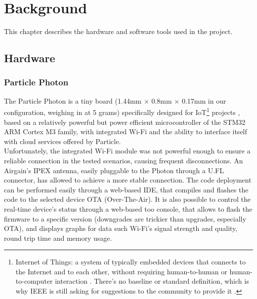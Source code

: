 \chapter{Background}
This chapter describes the hardware and software tools used in the project.

\section{Hardware}
\subsection{Particle Photon}
The Particle Photon is a tiny board (1.44mm $\times$ 0.8mm $\times$ 0.17mm in our configuration, weighing in at 5 grams) specifically designed for IoT\footnote{Internet of Things: a system of typically embedded devices that connects to the Internet and to each other, without requiring human-to-human or human-to-computer interaction \cite{WikipediaIoT}. There's no baseline or standard definition, which is why IEEE is still asking for suggestions to the community to provide it \cite{IEEEIoT}.} projects \cite{ParticlePhoton}, based on a relatively powerful but power efficient microcontroller of the STM32 ARM Cortex M3 family, with integrated Wi-Fi and the ability to interface itself with cloud services offered by Particle.\\
Unfortunately, the integrated Wi-Fi module was not powerful enough to ensure a reliable connection in the tested scenarios, causing frequent disconnections. An Airgain's IPEX antenna, easily pluggable to the Photon through a U.FL connector, has allowed to achieve a more stable connection.
The code deployment can be performed easily through a web-based IDE, that compiles and flashes the code to the selected device OTA (Over-The-Air). It is also possible to control the real-time device's status through a web-based too console, that allows to flash the firmware to a specific version (downgrades are trickier than upgrades, especially OTA), and displays graphs for data such Wi-Fi's signal strength and quality, round trip time and memory usage.

